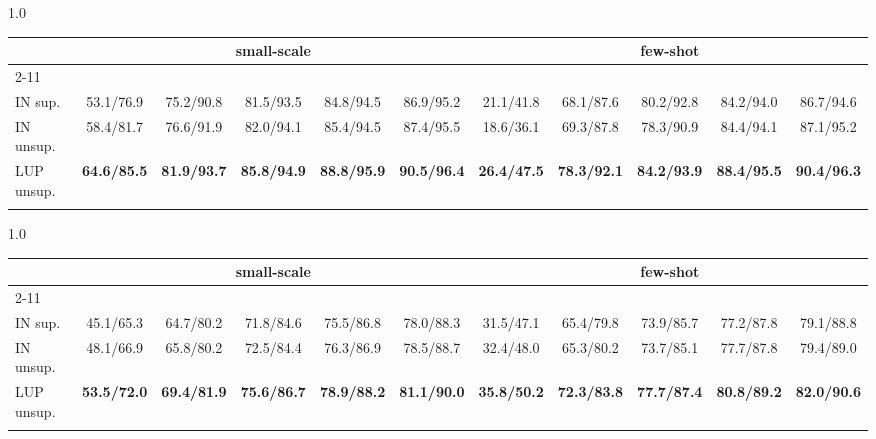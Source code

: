 \documentclass[final]{cvpr}
\begin{document}
\begin{table*}[h]
\setlength{\tabcolsep}{1.8mm}
\small
    \begin{subtable}[h]{1.0\textwidth}
        \centering
        \begin{tabular}{l|ccccc|ccccc}
        \shline
        \multirow{2}{*}{pre-train} & \multicolumn{5}{c|}{small-scale} & \multicolumn{5}{c}{few-shot} \\ \cline{2-11} &  &  &  &  &  &  &  &  &  &  \\ \hline
        IN sup.    & 53.1/76.9 & 75.2/90.8 & 81.5/93.5 & 84.8/94.5 & 86.9/95.2 & 21.1/41.8 & 68.1/87.6 & 80.2/92.8 & 84.2/94.0 & 86.7/94.6 \\ \hline
        IN unsup.  & 58.4/81.7 & 76.6/91.9 & 82.0/94.1 & 85.4/94.5 & 87.4/95.5 & 18.6/36.1 & 69.3/87.8 & 78.3/90.9 & 84.4/94.1 & 87.1/95.2 \\ \hline
        LUP unsup. & \textbf{64.6/85.5} & \textbf{81.9/93.7} & \textbf{85.8/94.9} & \textbf{88.8/95.9} & \textbf{90.5/96.4} & \textbf{26.4/47.5} & \textbf{78.3/92.1} & \textbf{84.2/93.9} & \textbf{88.4/95.5} & \textbf{90.4/96.3} \\ \shline
    \end{tabular}
    \vspace{-0.12cm}
    \caption{Market1501}
    \label{tab:sd-fw-market}
    \end{subtable}
    
   \begin{subtable}[h]{1.0\textwidth}
        \centering
        \begin{tabular}{l|ccccc|ccccc}
        \shline
        \multirow{2}{*}{pre-train} & \multicolumn{5}{c|}{small-scale} & \multicolumn{5}{c}{few-shot} \\ \cline{2-11} &  &  &  &  &  &  &  &  &  &  \\ \hline
        IN sup.    & 45.1/65.3 & 64.7/80.2 & 71.8/84.6 & 75.5/86.8 & 78.0/88.3 & 31.5/47.1 & 65.4/79.8 & 73.9/85.7 & 77.2/87.8 & 79.1/88.8 \\ \hline
        IN unsup.  & 48.1/66.9 & 65.8/80.2 & 72.5/84.4 & 76.3/86.9 & 78.5/88.7 & 32.4/48.0 & 65.3/80.2 & 73.7/85.1 & 77.7/87.8 & 79.4/89.0 \\ \hline
        LUP unsup. & \textbf{53.5/72.0} & \textbf{69.4/81.9} & \textbf{75.6/86.7} & \textbf{78.9/88.2} & \textbf{81.1/90.0} & \textbf{35.8/50.2} & \textbf{72.3/83.8} & \textbf{77.7/87.4} & \textbf{80.8/89.2} & \textbf{82.0/90.6} \\ \shline
    \end{tabular}
    \vspace{-0.12cm}
    \caption{DukeMTMC}
    \label{tab:sd-fw-duke}
    \end{subtable}
    

\end{table*}
\end{document}
